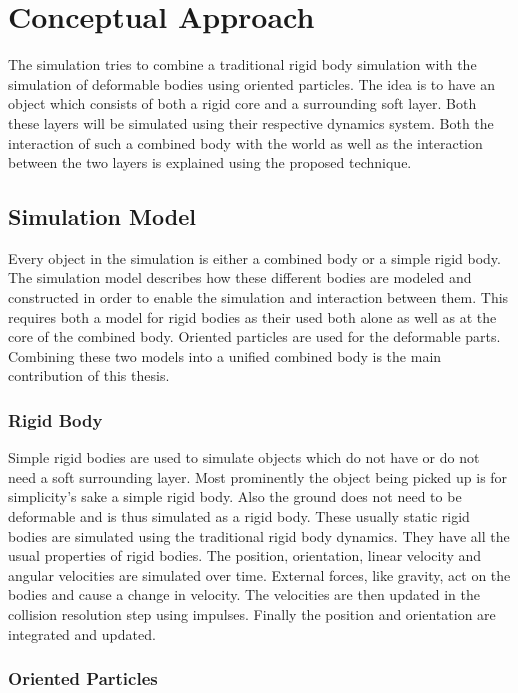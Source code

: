 \chapter{Conceptual Approach}
\label{cha:conceptual_approach}

The simulation tries to combine a traditional rigid body simulation with the simulation of deformable bodies using oriented particles. The idea is to have an object which consists of both a rigid core and a surrounding soft layer. Both these layers will be simulated using their respective dynamics system. Both the interaction of such a combined body with the world as well as the interaction between the two layers is explained using the proposed technique.

\section{Simulation Model}
\label{sec:simulation_model}

Every object in the simulation is either a combined body or a simple rigid body. The simulation model describes how these different bodies are modeled and constructed in order to enable the simulation and interaction between them. This requires both a model for rigid bodies as their used both alone as well as at the core of the combined body. Oriented particles are used for the deformable parts. Combining these two models into a unified combined body is the main contribution of this thesis.
\subsection{Rigid Body}

Simple rigid bodies are used to simulate objects which do not have or do not need a soft surrounding layer. Most prominently the object being picked up is for simplicity's sake a simple rigid body. Also the ground does not need to be deformable and is thus simulated as a rigid body. These usually static rigid bodies are simulated using the traditional rigid body dynamics. They have all the usual properties of rigid bodies. The position, orientation, linear velocity and angular velocities are simulated over time. External forces, like gravity, act on the bodies and cause a change in velocity. The velocities are then updated in the collision resolution step using impulses. Finally the position and orientation are integrated and updated.

\subsection{Oriented Particles}

